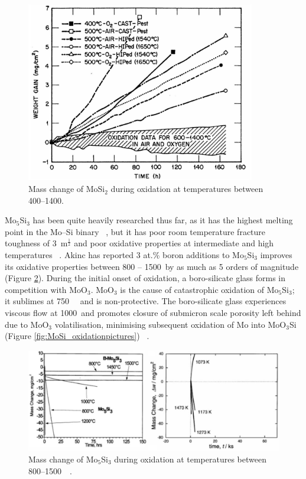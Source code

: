 %
\vspace{6mm}
\begin{figure}[H]
\begin{center}
\includegraphics[width=10cm]{MoSi2_oxidation}
\caption{Mass change of MoSi$_2$ during oxidation at temperatures between 400--1400\celsius. ~\cite{inui00}}
\label{fig:MoSi2_oxidation}
\end{center}
\end{figure}
\vspace{-5mm}
%
Mo$_5$Si$_3$ has been quite heavily researched thus far, as it has the highest melting point in the Mo--Si binary ~\cite{svechnikov70}, but it has poor room temperature fracture toughness of 3 \mega\pascal\,m$^\frac{1}{2}$ and poor oxidative properties at intermediate and high temperatures ~\cite{akinc99, anton89, anton89b}. Akinc has reported 3 at.\% boron additions to Mo$_5$Si$_3$ improves its oxidative properties between 800 -- 1500\celsius\ by as much as 5 orders of magnitude (Figure \ref{fig:Mo5Si3_oxidation}).  During the initial onset of oxidation, a boro-silicate glass forms in competition with MoO$_3$.  MoO$_3$ is the cause of catastrophic oxidation of Mo$_5$Si$_3$; it sublimes at 750\celsius\ ~\cite{brewer90} and is non-protective.  The boro-silicate glass experiences viscous flow at 1000\celsius\ and promotes closure of submicron scale porosity left behind due to MoO$_3$ volatilisation, minimising subsequent oxidation of Mo into MoO$_3$Si (Figure \ref{fig:MoSi_oxidationpictures}) ~\cite{akinc99}. 
% 
\begin{figure}[H]
\begin{center}
\includegraphics[width=.9\textwidth]{Mo5Si3_oxidation}
\vspace{-.3cm}
\caption{Mass change of Mo$_5$Si$_3$ during oxidation at temperatures between 800--1500\celsius\ ~\cite{akinc99}.}\label{fig:Mo5Si3_oxidation}
\end{center}
\end{figure}
